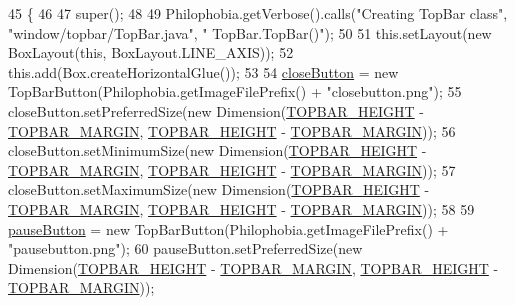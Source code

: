 \begin{DoxyCode}
45                     \{
46 
47         super();
48 
49         Philophobia.getVerbose().calls(\textcolor{stringliteral}{"Creating TopBar class"}, \textcolor{stringliteral}{"window/topbar/TopBar.java"}, \textcolor{stringliteral}{"
      TopBar.TopBar()"});
50 
51         this.setLayout(\textcolor{keyword}{new} BoxLayout(\textcolor{keyword}{this}, BoxLayout.LINE\_AXIS));
52         this.add(Box.createHorizontalGlue());
53 
54         \hyperlink{classwindow_1_1topbar_1_1_top_bar_a98271c11b9bbb79d1e79e03752d4e0b4}{closeButton} = \textcolor{keyword}{new} TopBarButton(Philophobia.getImageFilePrefix() + \textcolor{stringliteral}{"closebutton.png"});
55         closeButton.setPreferredSize(\textcolor{keyword}{new} Dimension(\hyperlink{classwindow_1_1topbar_1_1_top_bar_aa7100cb3da5276c12e4fae659823bf4e}{TOPBAR\_HEIGHT} - 
      \hyperlink{classwindow_1_1topbar_1_1_top_bar_a8d48486507d36a825223a21b1b6333ac}{TOPBAR\_MARGIN}, \hyperlink{classwindow_1_1topbar_1_1_top_bar_aa7100cb3da5276c12e4fae659823bf4e}{TOPBAR\_HEIGHT} - \hyperlink{classwindow_1_1topbar_1_1_top_bar_a8d48486507d36a825223a21b1b6333ac}{TOPBAR\_MARGIN}));
56         closeButton.setMinimumSize(\textcolor{keyword}{new} Dimension(\hyperlink{classwindow_1_1topbar_1_1_top_bar_aa7100cb3da5276c12e4fae659823bf4e}{TOPBAR\_HEIGHT} - 
      \hyperlink{classwindow_1_1topbar_1_1_top_bar_a8d48486507d36a825223a21b1b6333ac}{TOPBAR\_MARGIN}, \hyperlink{classwindow_1_1topbar_1_1_top_bar_aa7100cb3da5276c12e4fae659823bf4e}{TOPBAR\_HEIGHT} - \hyperlink{classwindow_1_1topbar_1_1_top_bar_a8d48486507d36a825223a21b1b6333ac}{TOPBAR\_MARGIN}));
57         closeButton.setMaximumSize(\textcolor{keyword}{new} Dimension(\hyperlink{classwindow_1_1topbar_1_1_top_bar_aa7100cb3da5276c12e4fae659823bf4e}{TOPBAR\_HEIGHT} - 
      \hyperlink{classwindow_1_1topbar_1_1_top_bar_a8d48486507d36a825223a21b1b6333ac}{TOPBAR\_MARGIN}, \hyperlink{classwindow_1_1topbar_1_1_top_bar_aa7100cb3da5276c12e4fae659823bf4e}{TOPBAR\_HEIGHT} - \hyperlink{classwindow_1_1topbar_1_1_top_bar_a8d48486507d36a825223a21b1b6333ac}{TOPBAR\_MARGIN}));
58 
59         \hyperlink{classwindow_1_1topbar_1_1_top_bar_ac7b4f88657cb97d1ae3df6a99d3694e9}{pauseButton} = \textcolor{keyword}{new} TopBarButton(Philophobia.getImageFilePrefix() + \textcolor{stringliteral}{"pausebutton.png"});
60         pauseButton.setPreferredSize(\textcolor{keyword}{new} Dimension(\hyperlink{classwindow_1_1topbar_1_1_top_bar_aa7100cb3da5276c12e4fae659823bf4e}{TOPBAR\_HEIGHT} - 
      \hyperlink{classwindow_1_1topbar_1_1_top_bar_a8d48486507d36a825223a21b1b6333ac}{TOPBAR\_MARGIN}, \hyperlink{classwindow_1_1topbar_1_1_top_bar_aa7100cb3da5276c12e4fae659823bf4e}{TOPBAR\_HEIGHT} - \hyperlink{classwindow_1_1topbar_1_1_top_bar_a8d48486507d36a825223a21b1b6333ac}{TOPBAR\_MARGIN}));

\end{DoxyCode}
